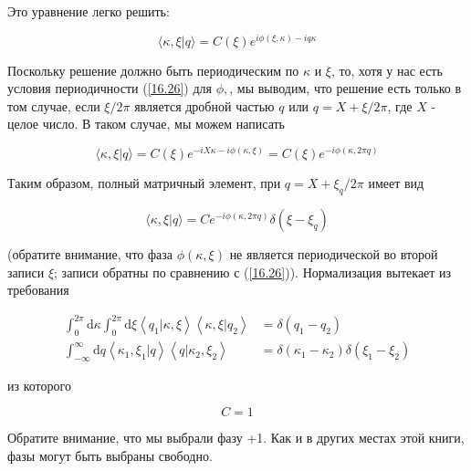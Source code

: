 \documentclass[main.tex]{subfiles}
\begin{document}
Это уравнение легко решить:

\begin{equation}\label{16.52} 
\langle\kappa, \xi | q\rangle= C(\xi) e^{i \phi(\xi, \kappa)-i q \kappa}
\end{equation}

Поскольку решение должно быть периодическим по $\kappa$ и $\xi$, то, хотя у нас есть условия периодичности (\ref{16.26}) для $\phi,$, мы выводим, что решение есть только в том случае, если $\xi / 2 \pi$ является дробной частью $q$ или $q=X+\xi / 2 \pi$, где $X$ - целое число. В таком случае, мы можем написать

\begin{equation}\label{16.53} 
\langle\kappa, \xi | q\rangle= C(\xi) e^{-i X \kappa-i \phi(\kappa, \xi)}=C(\xi) e^{-i \phi(\kappa, 2 \pi q)}
\end{equation}

Таким образом, полный матричный элемент, при $q=X+\xi_{q} / 2 \pi$ имеет вид

\begin{equation}\label{16.54} 
\langle\kappa, \xi | q\rangle= C e^{-i \phi(\kappa, 2 \pi q)} \delta\left(\xi-\xi_{q}\right)
\end{equation}

(обратите внимание, что фаза $\phi(\kappa, \xi)$ не является периодической во второй записи $\xi$; записи обратны по сравнению с (\ref{16.26})). Нормализация вытекает из требования

\begin{equation}\label{16.55}
	\begin{aligned}
\int_{0}^{2 \pi} \mathrm{d} \kappa \int_{0}^{2 \pi} \mathrm{d} \xi\left\langle q_{1} | \kappa, \xi\right\rangle\left\langle\kappa, \xi | q_{2}\right\rangle &=\delta\left(q_{1}-q_{2}\right) \\
\int_{-\infty}^{\infty} \mathrm{d} q\left\langle\kappa_{1}, \xi_{1} | q\right\rangle\left\langle q | \kappa_{2}, \xi_{2}\right\rangle &=\delta\left(\kappa_{1}-\kappa_{2}\right) \delta\left(\xi_{1}-\xi_{2}\right)
\end{aligned}
\end{equation}

из которого

\begin{equation}\label{16.56}
	C=1
\end{equation}

Обратите внимание, что мы выбрали фазу +1. Как и в других местах этой книги, фазы могут быть выбраны свободно.
\end{document}
